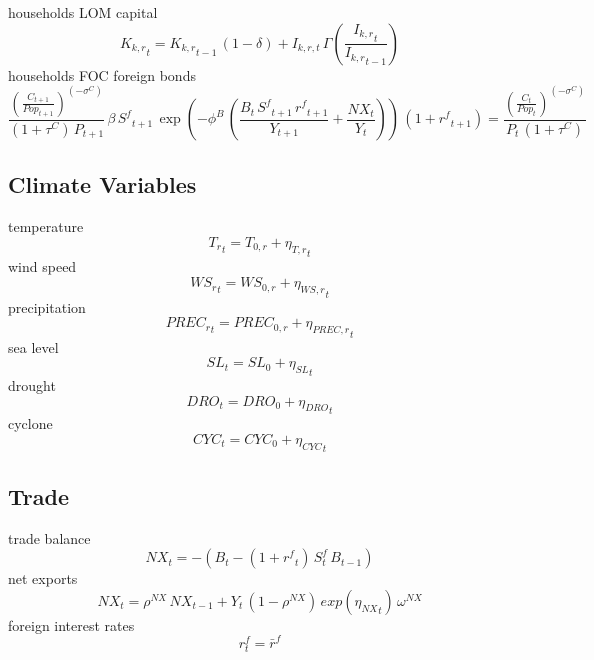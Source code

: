 households LOM capital
\begin{dmath}
{{K_{k,r}}_{t}}={{K_{k,r}}_{t-1}}\, \left(1-{{\delta}}\right) + I_{k,r,t} \, \Gamma\left(\frac{{{I_{k,r}}_{t}}}{{{I_{k,r}}_{t-1}}}\right)
\end{dmath}
households FOC foreign bonds
\begin{dmath}
\frac{\left(\frac{{C}_{t+1}}{{Pop}_{t+1}}\right)^{\left(-{{\sigma^{C}}}\right)}}{\left(1+{{\tau^{C}}}\right)\, {P}_{t+1}}\, {{\beta}}\, {S^{f}}_{t+1}\, \exp\left(-\phi^{B}\, \left(\frac{{B}_{t}\, {S^{f}}_{t+1}\, {{r^{f}}}_{t+1}}{{Y}_{t+1}}+\frac{{NX}_{t}}{{Y}_{t}}\right)\right)\, \left(1+{{r^{f}}}_{t+1}\right)=\frac{\left(\frac{{C}_{t}}{{Pop}_{t}}\right)^{\left(-{{\sigma^{C}}}\right)}}{{P}_{t}\, \left(1+{{\tau^{C}}}\right)}
\end{dmath}

\subsection{Climate Variables}
temperature
\begin{dmath}
{{T_{r}}_{t}}={{T_{0,r}}}+{{\eta_{T,r}}_{t}}
\end{dmath}
wind speed
\begin{dmath}
{{WS_{r}}_{t}}={{WS_{0,r}}}+{{\eta_{WS,r}}_{t}}
\end{dmath}
precipitation
\begin{dmath}
{{PREC_{r}}_{t}}={{PREC_{0,r}}}+{{\eta_{PREC,r}}_{t}}
\end{dmath}
sea level
\begin{dmath}
{{SL}_{t}}={{SL_0}}+{{\eta_{SL}}_{t}}
\end{dmath}
drought
\begin{dmath}
{{DRO}_{t}}={{DRO_0}}+{{\eta_{DRO}}_{t}}
\end{dmath}
cyclone
\begin{dmath}
{{CYC}_{t}}={{CYC_0}}+{{\eta_{CYC}}_{t}}
\end{dmath}

\subsection{Trade}
trade balance
\begin{dmath}
{NX_{t}}=-\left({B_{t}}-\left(1+{{r^{f}}_{t}}\right) \, S^{f}_{t} \, {B_{t-1}}\right)
\end{dmath}
net exports
\begin{dmath}
{NX_{t}}={{\rho^{NX}}}\, {NX_{t-1}}+{Y_{t}}\, \left(1-{{\rho^{NX}}}\right)\, exp\left({{\eta_{NX}}_{t}}\right)\, {{\omega^{NX}}}
\end{dmath}
foreign interest rates
\begin{dmath}
r^{f}_{t} = \bar{r}^{f}
\end{dmath}

